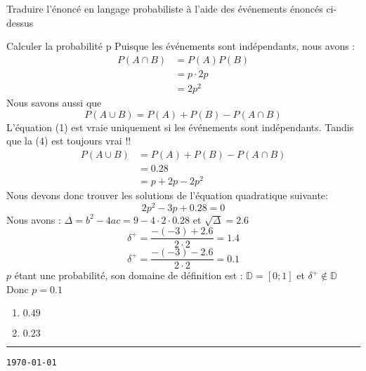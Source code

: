 \begin{exo}
\begin{subexo}{Traduire l'énoncé en langage probabiliste à l'aide des événements énoncés ci-dessus}
		\end{subexo}
		\begin{subexo}{Calculer la probabilité p}
			Puisque les événements sont indépendants, nous avons : 
					\begin{align}
						P(A \cap B) &= P(A) P(B)\\
				&= p \cdot 2p\\
				&= 2p^2
					\end{align}
				Nous savons aussi que
					\begin{equation}
						P(A \cup B) = P(A) + P(B) -P(A \cap B)
					\end{equation}
					L'équation (1) est vraie uniquement si les événements sont indépendants. Tandis que la (4) est toujours vrai !! 
					\begin{align}
						P(A \cup B) &= P(A) + P(B) -P(A \cap B)\\
						 &= 0.28\\
						 &= p + 2p - 2p^2
					\end{align}
					Nous devons donc trouver les solutions de l'équation quadratique suivante:
					$$2p^2 - 3p + 0.28 = 0$$
						Nous avons : $\Delta = b^2 -4ac = 9 -4\cdot 2\cdot 0.28$\newline
						 et $\sqrt{\Delta} = 2.6$
						 $$\delta^+ = \frac{-(-3) + 2.6}{2\cdot2} = 1.4$$
						 $$\delta^+ = \frac{-(-3) - 2.6}{2\cdot2} = 0.1$$
						$p$ étant une probabilité, son domaine de définition est : $\mathbb{D} = [0;1]$ et $\delta^+ \notin \mathbb{D}$ 
						Donc $p = 0.1$
		\end{subexo}
	\end{exo}
	
	\begin{exo}
		\begin{enumerate}[label=\alph*), parsep=0cm, itemsep=3mm, topsep=5mm]
			\item $0.49$
			\item $0.23$
		\end{enumerate}
	\end{exo}
	
	\vfill
	\hrule
	\vspace{2mm}
	 \hfill {\tt \tiny \today}

